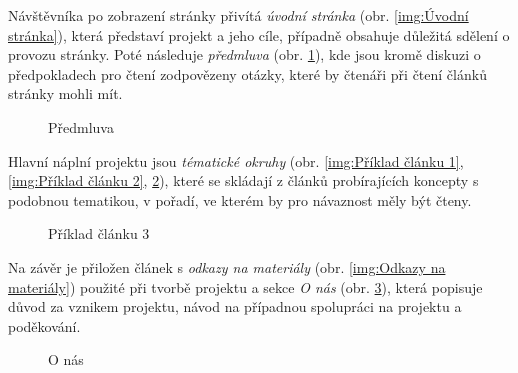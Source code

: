 \documentclass[a4paper, 12pt]{article}
\begin{document}
  Návštěvníka po zobrazení stránky přivítá \emph{úvodní stránka} (obr. \ref{img:Úvodní stránka}), která představí projekt a jeho cíle, případně obsahuje důležitá sdělení o provozu stránky. Poté následuje \emph{předmluva} (obr. \ref{img:Předmluva}), kde jsou kromě diskuzi o předpokladech pro čtení zodpovězeny otázky, které by čtenáři při čtení článků stránky mohli mít.

  \begin{figure}[H]
      \caption{Úvodní stránka} \label{img:Úvodní stránka}
    \endminipage\hfill
      \caption{Předmluva} \label{img:Předmluva}
    \endminipage
  \end{figure}

  Hlavní náplní projektu jsou \emph{tématické okruhy} (obr. \ref{img:Příklad článku 1}, \ref{img:Příklad článku 2}, \ref{img:Příklad článku 3}), které se skládají z článků probírajících koncepty s podobnou tematikou, v pořadí, ve kterém by pro návaznost měly být čteny.

  \begin{figure}[H]
      \caption{Příklad článku 1} \label{img:Příklad článku 1}
    \endminipage\hfill
      \caption{Příklad článku 2} \label{img:Příklad článku 2}
    \endminipage\hfill
      \caption{Příklad článku 3} \label{img:Příklad článku 3}
    \endminipage
  \end{figure}

  Na závěr je přiložen článek s \emph{odkazy na materiály} (obr. \ref{img:Odkazy na materiály}) použité při tvorbě projektu a sekce \emph{O nás} (obr. \ref{img:O nás}), která popisuje důvod za vznikem projektu, návod na případnou spolupráci na projektu a poděkování.

  \begin{figure}[H]
      \caption{Odkazy na materiály} \label{img:Odkazy na materiály}
    \endminipage\hfill
      \caption{O nás} \label{img:O nás}
    \endminipage
  \end{figure}
\end{document}
